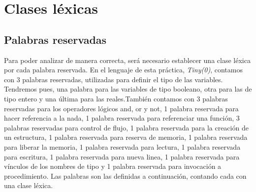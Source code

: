 \section{Clases léxicas}

\subsection{Palabras reservadas}

Para poder analizar de manera correcta, será necesario establecer una clase léxica por cada palabra reservada. En el lenguaje de
esta práctica, \textit{Tiny(0)}, contamos con 3 palabras reservadas, utilizadas para definir el tipo de las variables. Tendremos pues,
una palabra para las variables de tipo booleano, otra para las de tipo entero y una última para las reales.También contamos con
3 palabras reservadas para los operadores lógicos and, or y not, 1 palabra reservada para hacer referencia a la nada, 1 palabra reservada
para referenciar una función, 3 palabras reservadas para control de flujo, 1 palabra reservada para la creación de un estructura, 1 palabra reservada para reserva de memoria,
1 palabra reservada para liberar la memoria, 1 palabra reservada para lectura, 1 palabra reservada para escritura, 1 palabra reservada para nueva linea, 
1 palabra reservada para vínculos de los nombres de tipo y 1 palabra reservada para invocación a procedimiento. 
Las palabras son las definidas a continuación, contando cada con una clase léxica.

